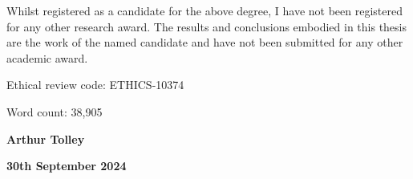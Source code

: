 Whilst registered as a candidate for the above degree, I have not been registered for any other research award. The results and conclusions embodied in this thesis are the work of the named candidate and have not been submitted for any other academic award.

\vspace{\baselineskip}
\noindent Ethical review code: ETHICS-10374

\vspace{\baselineskip}
\noindent Word count: 38,905

\noindent\hrulefill

\vspace{\baselineskip}
\noindent \textbf{Arthur Tolley}

\noindent \textbf{30th September 2024}